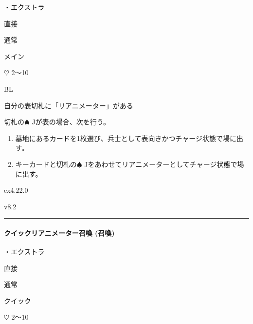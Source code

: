 \documentclass[letterpaper,10pt,dvipdfmx]{sphinxmanual}
\begin{document}
\sphinxAtStartPar
・エクストラ

\sphinxAtStartPar
{} 直接

\sphinxAtStartPar
{} 通常

\sphinxAtStartPar
{} メイン

\sphinxAtStartPar
{} {\normalsize $\heartsuit$} 2〜10

\sphinxAtStartPar
{} BL

\sphinxAtStartPar
{}

\sphinxAtStartPar
自分の表切札に「リアニメーター」がある

\sphinxAtStartPar
{}

\sphinxAtStartPar
切札の{\normalsize $\spadesuit$} Jが表の場合、次を行う。
\begin{enumerate}
%
\item {} 
\sphinxAtStartPar
墓地にあるカードを1枚選び、兵士として表向きかつチャージ状態で場に出す。

\item {} 
\sphinxAtStartPar
キーカードと切札の{\normalsize $\spadesuit$} Jをあわせてリアニメーターとしてチャージ状態で場に出す。

\end{enumerate}

\sphinxAtStartPar
{}  ex4.22.0

\sphinxAtStartPar
{}  v8.2


\bigskip\hrule\bigskip



\paragraph{クイックリアニメーター召喚 (召喚)}
\label{\detokenize{auto/frameActionlist:act-quicksummonreanimator}}\label{\detokenize{auto/frameActionlist:id26}}
\sphinxAtStartPar
{}

\sphinxAtStartPar
・エクストラ

\sphinxAtStartPar
{} 直接

\sphinxAtStartPar
{} 通常

\sphinxAtStartPar
{} クイック

\sphinxAtStartPar
{} {\normalsize $\heartsuit$} 2〜10
\end{document}
